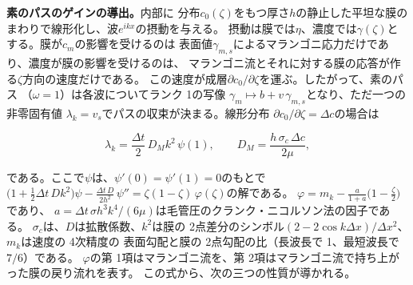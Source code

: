 \textbf{素のパスのゲインの導出。}内部に
分布$c_0(\zeta)$をもつ厚さ$h$の静止した平坦な膜のまわりで線形化し、波$e^{ikx}$の摂動を与える。
摂動は膜では$\eta$、濃度では$\gamma(\zeta)$とする。膜が$c_m$の影響を受けるのは
表面値$\gamma_{m,s}$によるマランゴニ応力だけであり、濃度が膜の影響を受けるのは、
マランゴニ流とそれに対する膜の応答が作る$\zeta$方向の速度だけである。
この速度が成層$\partial c_0/\partial\zeta$を運ぶ。したがって、素のパス
（$\omega = 1$）は各波についてランク 1の写像
$\gamma_m \mapsto b + v\,\gamma_{m,s}$となり、ただ一つの非零固有値
$\lambda_k = v_s$でパスの収束が決まる。線形分布
$\partial c_0/\partial\zeta = \Delta c$の場合は

\begin{equation}\label{eq:cz-gain}
  \lambda_k = \frac{\Delta t}{2}\,D_M k^2\,\psi(1), \qquad
  D_M = \frac{h\,\sigma_c\,\Delta c}{2\mu},
\end{equation}

である。ここで$\psi$は、$\psi'(0) = \psi'(1) = 0$のもとで
$\bigl(1 + \tfrac12\Delta t\,D k^2\bigr)\psi - \tfrac{\Delta t\,D}{2h^2}\,\psi''
 = \zeta(1-\zeta)\,\varphi(\zeta)$の解である。
$\varphi = m_k - \frac{a}{1+a}\bigl(1 - \frac{\zeta}{2}\bigr)$であり、
$a = \Delta t\,\sigma h^3 k^4/(6\mu)$は毛管圧のクランク・ニコルソン法の因子である。
$\sigma_c$は、$D$は拡散係数、$k^2$は膜の
2点差分のシンボル$(2 - 2\cos k\Delta x)/\Delta x^2$、$m_k$は速度の 4次精度の
表面勾配と膜の 2点勾配の比（長波長で 1、最短波長で$7/6$）である。
$\varphi$の第 1項はマランゴニ流を、第 2項はマランゴニ流で持ち上がった膜の戻り流れを表す。
この式から、次の三つの性質が導かれる。

